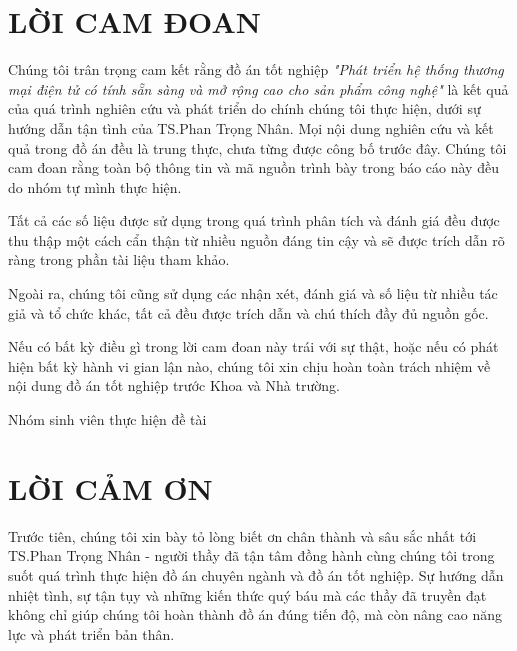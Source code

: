 


\section*{\Huge LỜI CAM ĐOAN}
\noindent Chúng tôi trân trọng cam kết rằng đồ án tốt nghiệp \textit{"Phát triển hệ thống thương mại điện tử có tính sẵn sàng và mở rộng cao cho sản phẩm công nghệ"} là kết quả của quá trình nghiên cứu và phát triển do chính chúng tôi thực hiện, dưới sự hướng dẫn tận tình của TS.Phan Trọng Nhân. Mọi nội dung nghiên cứu và kết quả trong đồ án đều là trung thực, chưa từng được công bố trước đây. Chúng tôi cam đoan rằng toàn bộ thông tin và mã nguồn trình bày trong báo cáo này đều do nhóm tự mình thực hiện.\vspace{0.5cm}

\noindent Tất cả các số liệu được sử dụng trong quá trình phân tích và đánh giá đều được thu thập một cách cẩn thận từ nhiều nguồn đáng tin cậy và sẽ được trích dẫn rõ ràng trong phần tài liệu tham khảo.\vspace{0.5cm}

\noindent Ngoài ra, chúng tôi cũng sử dụng các nhận xét, đánh giá và số liệu từ nhiều tác giả và tổ chức khác, tất cả đều được trích dẫn và chú thích đầy đủ nguồn gốc.\vspace{0.5cm}

\noindent Nếu có bất kỳ điều gì trong lời cam đoan này trái với sự thật, hoặc nếu có phát hiện bất kỳ hành vi gian lận nào, chúng tôi xin chịu hoàn toàn trách nhiệm về nội dung đồ án tốt nghiệp trước Khoa và Nhà trường.\vspace{0.5cm}

\begin{flushright}
Nhóm sinh viên thực hiện đề tài
\end{flushright}
\newpage
\section*{\Huge LỜI CẢM ƠN}
\noindent Trước tiên, chúng tôi xin bày tỏ lòng biết ơn chân thành và sâu sắc nhất tới TS.Phan Trọng Nhân - người thầy đã tận tâm đồng hành cùng chúng tôi trong suốt quá trình thực hiện đồ án chuyên ngành và đồ án tốt nghiệp. Sự hướng dẫn nhiệt tình, sự tận tụy và những kiến thức quý báu mà các thầy đã truyền đạt không chỉ giúp chúng tôi hoàn thành đồ án đúng tiến độ, mà còn nâng cao năng lực và phát triển bản thân.\vspace{0.5cm}

